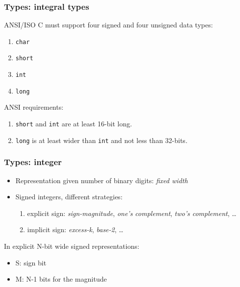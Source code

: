 \begin{frame}
  \frametitle{Types: integral types}
ANSI/ISO C must support four signed and four unsigned data types:
\begin{enumerate}
\item \texttt{char}
\item \texttt{short}
\item \texttt{int}
\item \texttt{long}
\end{enumerate}

\medskip
ANSI requirements:
\begin{enumerate}
\item \texttt{short} and \texttt{int} are at least 16-bit long.
\item \texttt{long} is at least wider than \texttt{int} and not less than 32-bits.
\end{enumerate}

\end{frame}

\begin{frame}
  \frametitle{Types: integer}

\begin{itemize}
\item Representation given number of binary digits: \textit{fixed width}
\item Signed integers, different strategies:
\begin{enumerate}
\item explicit sign: \textit{sign-magnitude}, \textit{one's complement}, \textit{two's complement}, \dots
\item implicit sign: \textit{excess-k}, \textit{base-2}, \dots
\end{enumerate}
\end{itemize}

\medskip
In explicit N-bit wide signed representations:
\begin{itemize}
\item S: sign bit
\item M: N-1 bits for the magnitude
\end{itemize}


  \begin{center}
    
  \end{center}

\end{frame}

